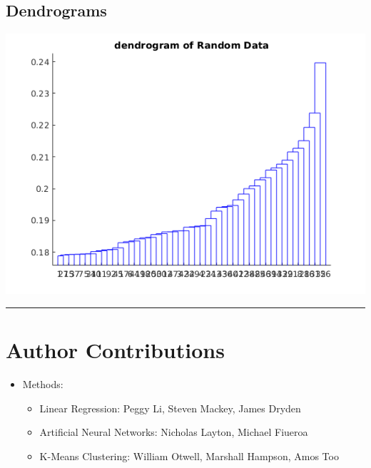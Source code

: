 \documentclass[12pt]{article}
\newcommand{\horizontalLine}{
	\begin{center}
		\hrule width 1.0\textwidth
	\end{center}
}
\begin{document}
\subsection{Dendrograms}
\label{subsec:dendrograms}
\includegraphics[scale=0.6]{images/clustering/h_random}
\horizontalLine
\section{Author Contributions}
\label{sec:authorContributions}
\begin{itemize}
    \item Methods:
    \begin{itemize}
        \item Linear Regression: Peggy Li, Steven Mackey, James Dryden
        \item Artificial Neural Networks: Nicholas Layton, Michael Fiueroa
        \item K-Means Clustering: William Otwell, Marshall Hampson, Amos Too
    \end{itemize}
\end{itemize}
\end{document}
